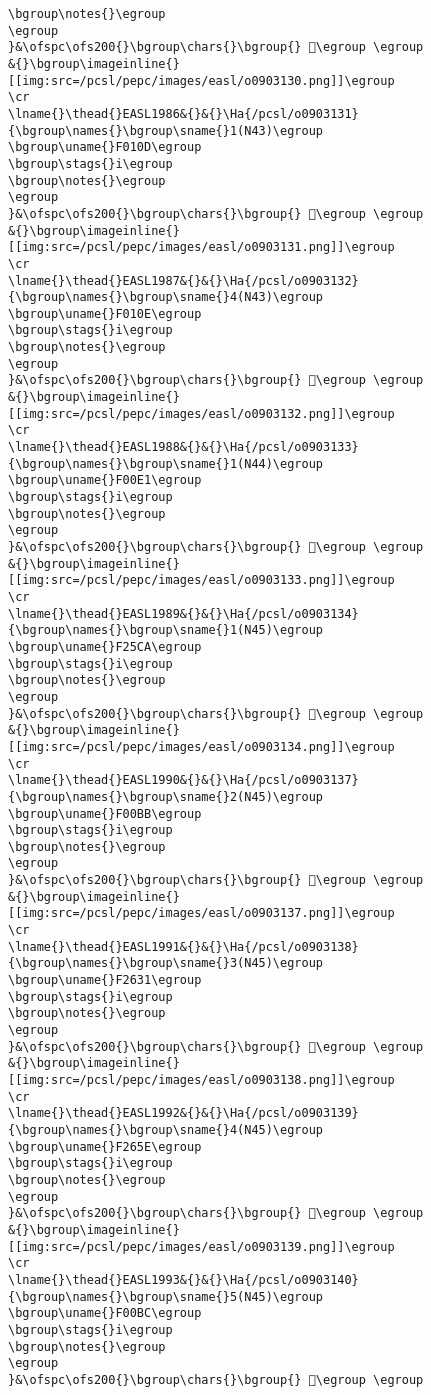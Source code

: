 \begin{verbatim}
\bgroup\notes{}\egroup
\egroup
}&\ofspc\ofs200{}\bgroup\chars{}\bgroup{} 󲙜\egroup \egroup
&{}\bgroup\imageinline{}[[img:src=/pcsl/pepc/images/easl/o0903130.png]]\egroup
\cr
\lname{}\thead{}EASL1986&{}&{}\Ha{/pcsl/o0903131}{\bgroup\names{}\bgroup\sname{}1(N43)\egroup
\bgroup\uname{}F010D\egroup
\bgroup\stags{}i\egroup
\bgroup\notes{}\egroup
\egroup
}&\ofspc\ofs200{}\bgroup\chars{}\bgroup{} 󰄍\egroup \egroup
&{}\bgroup\imageinline{}[[img:src=/pcsl/pepc/images/easl/o0903131.png]]\egroup
\cr
\lname{}\thead{}EASL1987&{}&{}\Ha{/pcsl/o0903132}{\bgroup\names{}\bgroup\sname{}4(N43)\egroup
\bgroup\uname{}F010E\egroup
\bgroup\stags{}i\egroup
\bgroup\notes{}\egroup
\egroup
}&\ofspc\ofs200{}\bgroup\chars{}\bgroup{} 󰄎\egroup \egroup
&{}\bgroup\imageinline{}[[img:src=/pcsl/pepc/images/easl/o0903132.png]]\egroup
\cr
\lname{}\thead{}EASL1988&{}&{}\Ha{/pcsl/o0903133}{\bgroup\names{}\bgroup\sname{}1(N44)\egroup
\bgroup\uname{}F00E1\egroup
\bgroup\stags{}i\egroup
\bgroup\notes{}\egroup
\egroup
}&\ofspc\ofs200{}\bgroup\chars{}\bgroup{} 󰃡\egroup \egroup
&{}\bgroup\imageinline{}[[img:src=/pcsl/pepc/images/easl/o0903133.png]]\egroup
\cr
\lname{}\thead{}EASL1989&{}&{}\Ha{/pcsl/o0903134}{\bgroup\names{}\bgroup\sname{}1(N45)\egroup
\bgroup\uname{}F25CA\egroup
\bgroup\stags{}i\egroup
\bgroup\notes{}\egroup
\egroup
}&\ofspc\ofs200{}\bgroup\chars{}\bgroup{} 󲗊\egroup \egroup
&{}\bgroup\imageinline{}[[img:src=/pcsl/pepc/images/easl/o0903134.png]]\egroup
\cr
\lname{}\thead{}EASL1990&{}&{}\Ha{/pcsl/o0903137}{\bgroup\names{}\bgroup\sname{}2(N45)\egroup
\bgroup\uname{}F00BB\egroup
\bgroup\stags{}i\egroup
\bgroup\notes{}\egroup
\egroup
}&\ofspc\ofs200{}\bgroup\chars{}\bgroup{} 󰂻\egroup \egroup
&{}\bgroup\imageinline{}[[img:src=/pcsl/pepc/images/easl/o0903137.png]]\egroup
\cr
\lname{}\thead{}EASL1991&{}&{}\Ha{/pcsl/o0903138}{\bgroup\names{}\bgroup\sname{}3(N45)\egroup
\bgroup\uname{}F2631\egroup
\bgroup\stags{}i\egroup
\bgroup\notes{}\egroup
\egroup
}&\ofspc\ofs200{}\bgroup\chars{}\bgroup{} 󲘱\egroup \egroup
&{}\bgroup\imageinline{}[[img:src=/pcsl/pepc/images/easl/o0903138.png]]\egroup
\cr
\lname{}\thead{}EASL1992&{}&{}\Ha{/pcsl/o0903139}{\bgroup\names{}\bgroup\sname{}4(N45)\egroup
\bgroup\uname{}F265E\egroup
\bgroup\stags{}i\egroup
\bgroup\notes{}\egroup
\egroup
}&\ofspc\ofs200{}\bgroup\chars{}\bgroup{} 󲙞\egroup \egroup
&{}\bgroup\imageinline{}[[img:src=/pcsl/pepc/images/easl/o0903139.png]]\egroup
\cr
\lname{}\thead{}EASL1993&{}&{}\Ha{/pcsl/o0903140}{\bgroup\names{}\bgroup\sname{}5(N45)\egroup
\bgroup\uname{}F00BC\egroup
\bgroup\stags{}i\egroup
\bgroup\notes{}\egroup
\egroup
}&\ofspc\ofs200{}\bgroup\chars{}\bgroup{} 󰂼\egroup \egroup

\end{verbatim}
